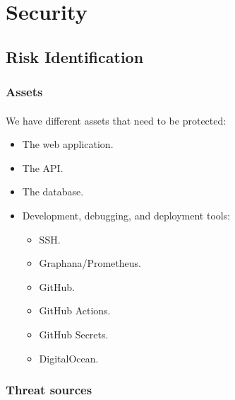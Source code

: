 \section{Security}
\subsection{Risk Identification}
\subsubsection{Assets}
\paragraph{} We have different assets that need to be protected:
\begin{itemize}
	\item The web application.
	\item The API.
	\item The database.
	\item Development, debugging, and deployment tools:
	      \begin{itemize}
		      \item SSH.
		      \item Graphana/Prometheus.
		      \item GitHub.
		      \item GitHub Actions.
		      \item GitHub Secrets.
		      \item DigitalOcean.
	      \end{itemize}
\end{itemize}

\subsubsection{Threat sources}
